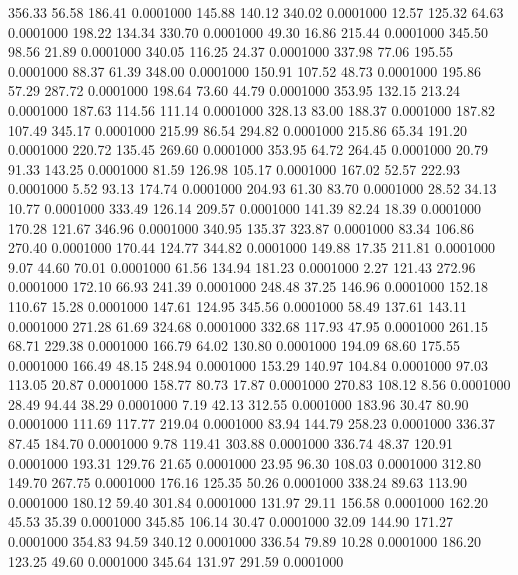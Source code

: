  356.33   56.58  186.41   0.0001000
 145.88  140.12  340.02   0.0001000
  12.57  125.32   64.63   0.0001000
 198.22  134.34  330.70   0.0001000
  49.30   16.86  215.44   0.0001000
 345.50   98.56   21.89   0.0001000
 340.05  116.25   24.37   0.0001000
 337.98   77.06  195.55   0.0001000
  88.37   61.39  348.00   0.0001000
 150.91  107.52   48.73   0.0001000
 195.86   57.29  287.72   0.0001000
 198.64   73.60   44.79   0.0001000
 353.95  132.15  213.24   0.0001000
 187.63  114.56  111.14   0.0001000
 328.13   83.00  188.37   0.0001000
 187.82  107.49  345.17   0.0001000
 215.99   86.54  294.82   0.0001000
 215.86   65.34  191.20   0.0001000
 220.72  135.45  269.60   0.0001000
 353.95   64.72  264.45   0.0001000
  20.79   91.33  143.25   0.0001000
  81.59  126.98  105.17   0.0001000
 167.02   52.57  222.93   0.0001000
   5.52   93.13  174.74   0.0001000
 204.93   61.30   83.70   0.0001000
  28.52   34.13   10.77   0.0001000
 333.49  126.14  209.57   0.0001000
 141.39   82.24   18.39   0.0001000
 170.28  121.67  346.96   0.0001000
 340.95  135.37  323.87   0.0001000
  83.34  106.86  270.40   0.0001000
 170.44  124.77  344.82   0.0001000
 149.88   17.35  211.81   0.0001000
   9.07   44.60   70.01   0.0001000
  61.56  134.94  181.23   0.0001000
   2.27  121.43  272.96   0.0001000
 172.10   66.93  241.39   0.0001000
 248.48   37.25  146.96   0.0001000
 152.18  110.67   15.28   0.0001000
 147.61  124.95  345.56   0.0001000
  58.49  137.61  143.11   0.0001000
 271.28   61.69  324.68   0.0001000
 332.68  117.93   47.95   0.0001000
 261.15   68.71  229.38   0.0001000
 166.79   64.02  130.80   0.0001000
 194.09   68.60  175.55   0.0001000
 166.49   48.15  248.94   0.0001000
 153.29  140.97  104.84   0.0001000
  97.03  113.05   20.87   0.0001000
 158.77   80.73   17.87   0.0001000
 270.83  108.12    8.56   0.0001000
  28.49   94.44   38.29   0.0001000
   7.19   42.13  312.55   0.0001000
 183.96   30.47   80.90   0.0001000
 111.69  117.77  219.04   0.0001000
  83.94  144.79  258.23   0.0001000
 336.37   87.45  184.70   0.0001000
   9.78  119.41  303.88   0.0001000
 336.74   48.37  120.91   0.0001000
 193.31  129.76   21.65   0.0001000
  23.95   96.30  108.03   0.0001000
 312.80  149.70  267.75   0.0001000
 176.16  125.35   50.26   0.0001000
 338.24   89.63  113.90   0.0001000
 180.12   59.40  301.84   0.0001000
 131.97   29.11  156.58   0.0001000
 162.20   45.53   35.39   0.0001000
 345.85  106.14   30.47   0.0001000
  32.09  144.90  171.27   0.0001000
 354.83   94.59  340.12   0.0001000
 336.54   79.89   10.28   0.0001000
 186.20  123.25   49.60   0.0001000
 345.64  131.97  291.59   0.0001000
